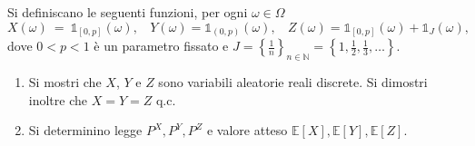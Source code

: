Si definiscano le seguenti funzioni, per ogni $\omega \in \Omega $
\begin{equation*}
X( \omega ) \ =\ \mathbb{1}_{[ 0,p]}( \omega ) ,\ \ \ \ Y( \omega ) =\mathbb{1}_{( 0,p)}( \omega ) ,\ \ \ \ Z( \omega ) =\mathbb{1}_{[ 0,p]}( \omega ) +\mathbb{1}_{J}( \omega ) ,
\end{equation*}
dove $0< p< 1$ è un parametro fissato e $J=\left\{\frac{1}{n}\right\}_{n\in \mathbb{N}} =\left\{1,\frac{1}{2} ,\frac{1}{3} ,\dotsc \right\}$.
\begin{enumerate}
\item Si mostri che $X$, $Y$ e $Z$ sono variabili aleatorie reali discrete. Si dimostri inoltre che $X=Y=Z$ q.c.
\item Si determinino legge $P^{X} ,P^{Y} ,P^{Z}$ e valore atteso $\mathbb{E}[ X] ,\mathbb{E}[ Y] ,\mathbb{E}[ Z]$.
\end{enumerate}
\subsection{}

